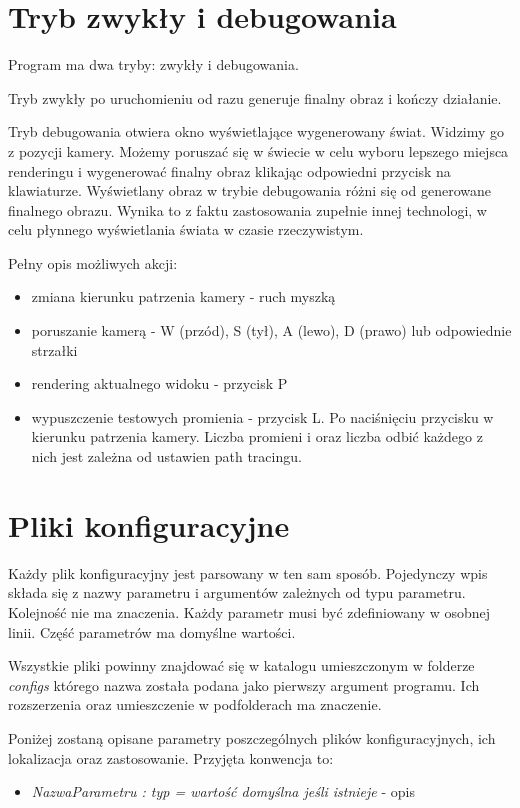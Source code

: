 \documentclass[inz,longabstract]{iithesis}
\begin{document}
    \section{Tryb zwykły i debugowania}
        Program ma dwa tryby: zwykły i debugowania. 
        
        Tryb zwykły po uruchomieniu od razu generuje finalny obraz i kończy działanie. 
        
        Tryb debugowania otwiera okno wyświetlające wygenerowany świat. Widzimy go z pozycji kamery. Możemy poruszać się w świecie w celu wyboru lepszego miejsca renderingu i wygenerować finalny obraz klikając odpowiedni przycisk na klawiaturze. Wyświetlany obraz w trybie debugowania różni się od generowane finalnego obrazu. Wynika to z faktu zastosowania zupełnie innej technologi, w celu płynnego wyświetlania świata w czasie rzeczywistym.
        
        Pełny opis możliwych akcji:
        \begin{itemize}
            \item zmiana kierunku patrzenia kamery - ruch myszką
            \item poruszanie kamerą - W (przód), S (tył), A (lewo), D (prawo) lub odpowiednie strzałki
            \item rendering aktualnego widoku - przycisk P
            \item wypuszczenie testowych promienia - przycisk L. Po naciśnięciu przycisku w kierunku patrzenia kamery. Liczba promieni i oraz liczba odbić każdego z nich jest zależna od ustawien path tracingu.
        \end{itemize}
    \section{Pliki konfiguracyjne}
        Każdy plik konfiguracyjny jest parsowany w ten sam sposób. Pojedynczy wpis składa się z nazwy parametru i argumentów zależnych od typu parametru. Kolejność nie ma znaczenia. Każdy parametr musi być zdefiniowany w osobnej linii. Część parametrów ma domyślne wartości. 
        
        Wszystkie pliki powinny znajdować się w katalogu umieszczonym w folderze \textit{configs} którego nazwa została podana jako pierwszy argument programu. Ich rozszerzenia oraz umieszczenie w podfolderach ma znaczenie.
        
        Poniżej zostaną opisane parametry poszczególnych plików konfiguracyjnych, ich lokalizacja oraz zastosowanie. Przyjęta konwencja to:
        \begin{itemize}
            \item \textit{NazwaParametru : typ = wartość domyślna jeśli istnieje} - opis
        \end{itemize}
        
\end{document}
